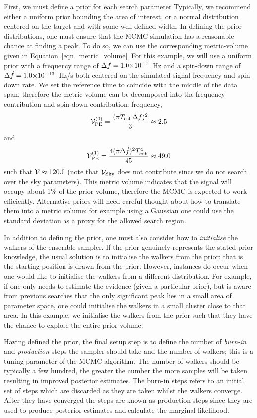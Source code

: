 \documentclass[aps, prd, twocolumn, superscriptaddress, floatfix, showpacs, nofootinbib, longbibliography]{revtex4-1}
\begin{document}
First, we must define a prior for each search parameter Typically, we recommend
either a uniform prior bounding the area of interest, or a normal distribution
centered on the target and with some well defined width. In defining the prior
distributions, one must ensure
that the MCMC simulation has a reasonable chance at finding a peak. To do so,
we can use the corresponding metric-volume given in
Equation~\eqref{eqn_metric_volume}. For this example, we will use a uniform
prior with a frequency range of $\Delta f=1.0{\times}10^{-7}$~Hz and a
spin-down range of $\Delta \dot{f}=1.0{\times}10^{-13}$~Hz/s both centered on
the simulated signal frequency and spin-down rate. We set the reference time to
coincide with the middle of the data span, therefore the metric volume can be
decomposed into the frequency contribution and spin-down contribution:
frequency,
\begin{align}
\mathcal{V}_{\rm PE}^{(0)} = \frac{(\pi T_{\rm coh}\Delta f)^2}{3} \approx 2.5
\end{align}
and
\begin{align}
\mathcal{V}_{\rm PE}^{(1)} = \frac{4(\pi\Delta \dot{f})^2T_{\rm coh}^{4}}{45} \approx 49.0
\end{align}
such that $\mathcal{V}\approx120.0$ (note that $\mathcal{V}_{\rm Sky}$ does not contribute
since we do not search over the sky parameters). This metric volume indicates
that the signal will occupy about 1\% of the prior volume, therefore the MCMC
is expected to work efficiently. Alternative priors will need careful thought about how to
translate them into a metric volume: for example using a Gaussian one could use
the standard deviation as a proxy for the allowed search region.

In addition to defining the prior, one must also consider how to
\emph{initialise} the walkers of the ensemble sampler. If the prior genuinely
represents the stated prior knowledge, the usual solution is to initialise the
walkers from the prior: that is the starting position is drawn from the prior.
However, instances do occur when one would like to initialise the walkers from
a different distribution. For example, if one only needs to estimate the
evidence (given a particular prior), but is aware from previous searches that
the only significant peak lies in a small area of parameter space, one could
initialise the walkers in a small cluster close to that area. In this example,
we initialise the walkers from the prior such that they have the chance to
explore the entire prior volume.

Having defined the prior, the final setup step is to define the number of
\emph{burn-in} and \emph{production} steps the sampler should take and the
number of walkers; this is a tuning parameter of the MCMC algorithm. The number
of walkers should be typically a few hundred, the greater the number the more
samples will be taken resulting in improved posterior estimates. The burn-in
steps refers to an initial set of steps which are discarded as they are taken
whilst the walkers converge. After they have converged the steps are known as
production steps since they are used to produce posterior estimates and
calculate the marginal likelihood.
\end{document}
